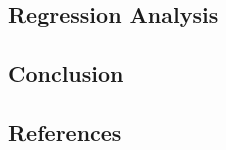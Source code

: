 \documentclass[
  letterpaper,
  DIV=11,
  numbers=noendperiod]{scrartcl}
\begin{document}
\hypertarget{sec-analysis}{%
\subsection{Regression Analysis}\label{sec-analysis}}

\hypertarget{conclusion}{%
\subsection{Conclusion}\label{conclusion}}

\newpage{}

\hypertarget{references}{%
\subsection{References}\label{references}}
\end{document}
